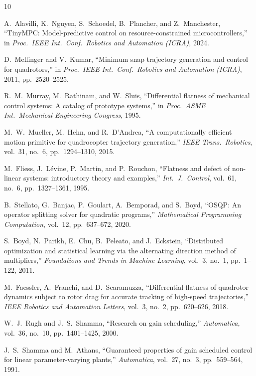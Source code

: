 \documentclass[letterpaper, 10pt, conference]{IEEEtran}
\begin{document}

\begin{thebibliography}{10}

A.~Alavilli, K.~Nguyen, S.~Schoedel, B.~Plancher, and Z.~Manchester,
``TinyMPC: Model-predictive control on resource-constrained
microcontrollers,''
in \emph{Proc.\ IEEE Int.\ Conf.\ Robotics and Automation (ICRA)},
2024.

D.~Mellinger and V.~Kumar,
``Minimum snap trajectory generation and control for quadrotors,''
in \emph{Proc.\ IEEE Int.\ Conf.\ Robotics and Automation (ICRA)},
2011, pp.~2520--2525.

R.~M.~Murray, M.~Rathinam, and W.~Sluis,
``Differential flatness of mechanical control systems: A catalog of
prototype systems,''
in \emph{Proc.\ ASME Int.\ Mechanical Engineering Congress},
1995.

M.~W.~Mueller, M.~Hehn, and R.~D'Andrea,
``A computationally efficient motion primitive for quadrocopter
trajectory generation,''
\emph{IEEE Trans.\ Robotics}, vol.~31, no.~6, pp.~1294--1310, 2015.

M.~Fliess, J.~L{\'e}vine, P.~Martin, and P.~Rouchon,
``Flatness and defect of non-linear systems: introductory theory
and examples,''
\emph{Int.\ J.\ Control}, vol.~61, no.~6, pp.~1327--1361, 1995.

B.~Stellato, G.~Banjac, P.~Goulart, A.~Bemporad, and S.~Boyd,
``OSQP: An operator splitting solver for quadratic programs,''
\emph{Mathematical Programming Computation}, vol.~12, pp.~637--672,
2020.

S.~Boyd, N.~Parikh, E.~Chu, B.~Peleato, and J.~Eckstein,
``Distributed optimization and statistical learning via the alternating
direction method of multipliers,''
\emph{Foundations and Trends in Machine Learning}, vol.~3, no.~1,
pp.~1--122, 2011.

M.~Faessler, A.~Franchi, and D.~Scaramuzza,
``Differential flatness of quadrotor dynamics subject to rotor drag
for accurate tracking of high-speed trajectories,''
\emph{IEEE Robotics and Automation Letters}, vol.~3, no.~2,
pp.~620--626, 2018.

W.~J.~Rugh and J.~S.~Shamma,
``Research on gain scheduling,''
\emph{Automatica}, vol.~36, no.~10, pp.~1401--1425, 2000.

J.~S.~Shamma and M.~Athans,
``Guaranteed properties of gain scheduled control for linear
parameter-varying plants,''
\emph{Automatica}, vol.~27, no.~3, pp.~559--564, 1991.


\end{thebibliography}
\end{document}
